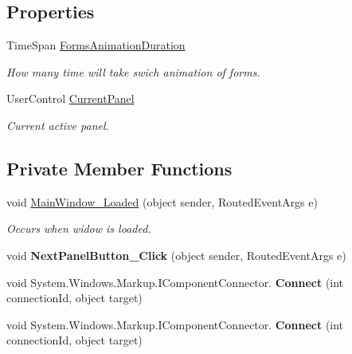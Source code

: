 \subsection*{Properties}
\begin{DoxyCompactItemize}
\item 
Time\+Span \mbox{\hyperlink{class_switch_panel_example_1_1_main_window_a05a9a158b92306ba73dbad36d7ed2fa8}{Forms\+Animation\+Duration}}
\begin{DoxyCompactList}\small\item\em How many time will take swich animation of forms. \end{DoxyCompactList}\item 
User\+Control \mbox{\hyperlink{class_switch_panel_example_1_1_main_window_aa22477560029b6d618de4024b1342342}{Current\+Panel}}
\begin{DoxyCompactList}\small\item\em Current active panel. \end{DoxyCompactList}\end{DoxyCompactItemize}
\subsection*{Private Member Functions}
\begin{DoxyCompactItemize}
\item 
void \mbox{\hyperlink{class_switch_panel_example_1_1_main_window_a12c47e04db6885919ad55ddd96b3aaee}{Main\+Window\+\_\+\+Loaded}} (object sender, Routed\+Event\+Args e)
\begin{DoxyCompactList}\small\item\em Occurs when widow is loaded. \end{DoxyCompactList}\item 
\mbox{\label{class_switch_panel_example_1_1_main_window_a39b17e50cfe19308718e61ff33cef404}} 
void {\bfseries Next\+Panel\+Button\+\_\+\+Click} (object sender, Routed\+Event\+Args e)
\item 
\mbox{\label{class_switch_panel_example_1_1_main_window_a0927adaf951d198d1f6c1fade838a6da}} 
void System.\+Windows.\+Markup.\+I\+Component\+Connector. {\bfseries Connect} (int connection\+Id, object target)
\item 
\mbox{\label{class_switch_panel_example_1_1_main_window_a0927adaf951d198d1f6c1fade838a6da}} 
void System.\+Windows.\+Markup.\+I\+Component\+Connector. {\bfseries Connect} (int connection\+Id, object target)
\end{DoxyCompactItemize}
